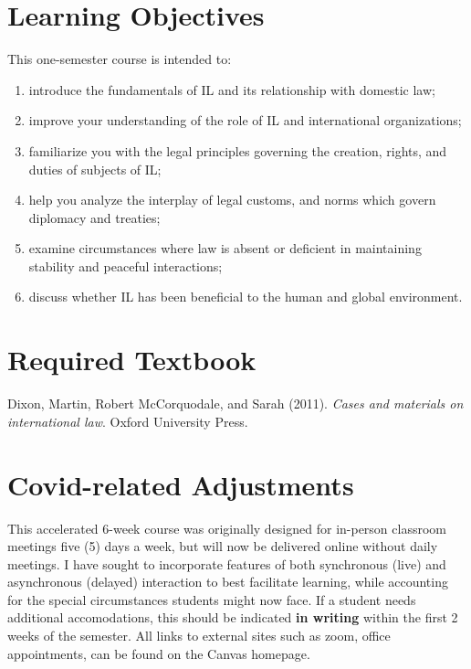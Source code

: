 \documentclass[10pt,]{article}
\providecommand{\tightlist}{%
  \setlength{\itemsep}{0pt}\setlength{\parskip}{0pt}}
\begin{document}
\hypertarget{learning-objectives}{%
\section{Learning Objectives}\label{learning-objectives}}

This one-semester course is intended to:

\begin{enumerate}
\def\labelenumi{\arabic{enumi}.}
\tightlist
\item
  introduce the fundamentals of IL and its relationship with domestic
  law;
\item
  improve your understanding of the role of IL and international
  organizations;
\item
  familiarize you with the legal principles governing the creation,
  rights, and duties of subjects of IL;
\item
  help you analyze the interplay of legal customs, and norms which
  govern diplomacy and treaties;
\item
  examine circumstances where law is absent or deficient in maintaining
  stability and peaceful interactions;
\item
  discuss whether IL has been beneficial to the human and global
  environment.
\end{enumerate}

\hypertarget{required-textbook}{%
\section{Required Textbook}\label{required-textbook}}

Dixon, Martin, Robert McCorquodale, and Sarah (2011).
\emph{Cases and materials on international law}. Oxford University
Press.

\hypertarget{covid-related-adjustments}{%
\section{Covid-related Adjustments}\label{covid-related-adjustments}}

This accelerated 6-week course was originally designed for in-person
classroom meetings five (5) days a week, but will now be delivered
online without daily meetings. I have sought to incorporate features of
both synchronous (live) and asynchronous (delayed) interaction to best
facilitate learning, while accounting for the special circumstances
students might now face. If a student needs additional accomodations,
this should be indicated \textbf{in writing} within the first 2 weeks of
the semester. All links to external sites such as zoom, office
appointments, can be found on the Canvas homepage.
\end{document}
